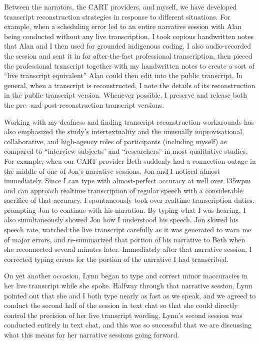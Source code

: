 Between the narrators, the CART providers, and myself, we have developed transcript reconstruction strategies in response to different situations. For example, when a scheduling error led to an entire narrative session with Alan being conducted without any live transcription, I took copious handwritten notes that Alan and I then used for grounded indigenous coding. I also audio-recorded the session and sent it in for after-the-fact professional transcription, then pieced the professional transcript together with my handwritten notes to create a sort of “live transcript equivalent” Alan could then edit into the public transcript. In general, when a transcript is reconstructed, I note the details of its reconstruction in the public transcript version. Whenever possible, I preserve and release both the pre- and post-reconstruction transcript versions.

Working with my deafness and finding transcript reconstruction workarounds has also emphasized the study’s intertextuality and the unusually improvisational, collaborative, and high-agency roles of participants (including myself) as compared to “interview subjects” and “researchers” in most qualitative studies. For example, when our CART provider Beth suddenly had a connection outage in the middle of one of Jon’s narrative sessions, Jon and I noticed almost immediately. Since I can type with almost-perfect accuracy at well over 135wpm and can approach realtime transcription of regular speech with a considerable sacrifice of that accuracy, I spontaneously took over realtime transcription duties, prompting Jon to continue with his narration. By typing what I was hearing, I also simultaneously showed Jon how I understood his speech. Jon slowed his speech rate, watched the live transcript carefully as it was generated to warn me of major errors, and re-summarized that portion of his narrative to Beth when she reconnected several minutes later. Immediately after that narrative session, I corrected typing errors for the portion of the narrative I had transcribed.

On yet another occasion, Lynn began to type and correct minor inaccuracies in her live transcript while she spoke. Halfway through that narrative session, Lynn pointed out that she and I both type nearly as fast as we speak, and we agreed to conduct the second half of the session in text chat so that she could directly control the precision of her live transcript wording. Lynn’s second session was conducted entirely in text chat, and this was so successful that we are discussing what this means for her narrative sessions going forward.

